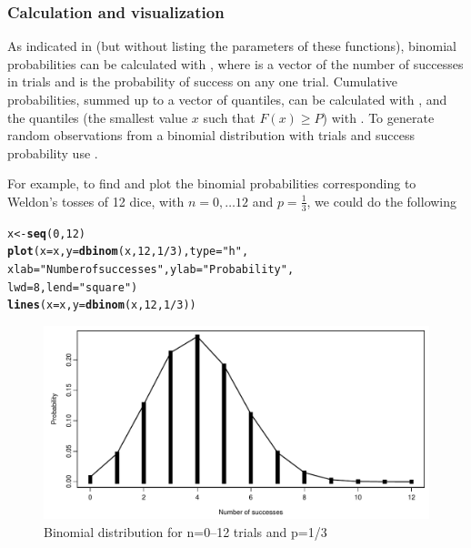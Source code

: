 \documentclass[11pt]{book}\usepackage[]{graphicx}\usepackage[]{color}
\makeatletter
\newcommand{\hlnum}[1]{\textcolor[rgb]{0.686,0.059,0.569}{#1}}%
\newcommand{\hlstr}[1]{\textcolor[rgb]{0.192,0.494,0.8}{#1}}%
\newcommand{\hlopt}[1]{\textcolor[rgb]{0,0,0}{#1}}%
\newcommand{\hlstd}[1]{\textcolor[rgb]{0.345,0.345,0.345}{#1}}%
\newcommand{\hlkwb}[1]{\textcolor[rgb]{0.69,0.353,0.396}{#1}}%
\newcommand{\hlkwc}[1]{\textcolor[rgb]{0.333,0.667,0.333}{#1}}%
\newcommand{\hlkwd}[1]{\textcolor[rgb]{0.737,0.353,0.396}{\textbf{#1}}}%
\newenvironment{kframe}{%
 \def\at@end@of@kframe{}%
 \ifinner\ifhmode%
  \def\at@end@of@kframe{\end{minipage}}%
  \begin{minipage}{\columnwidth}%
 \fi\fi%
 \def\FrameCommand##1{\hskip\@totalleftmargin \hskip-\fboxsep
 \colorbox{shadecolor}{##1}\hskip-\fboxsep
     \hskip-\linewidth \hskip-\@totalleftmargin \hskip\columnwidth}%
 \MakeFramed {\advance\hsize-\width
   \@totalleftmargin\z@ \linewidth\hsize
   \@setminipage}}%
 {\par\unskip\endMakeFramed%
 \at@end@of@kframe}
\newenvironment{knitrout}{}{} %
\renewenvironment{knitrout}{\small\renewcommand{\baselinestretch}{.85}}{} %
\makeatother
\begin{document}
\subsubsection{Calculation and visualization}
As indicated in  (but without listing the
parameters of these functions), 
binomial probabilities
can be calculated with , 
where  is a vector of the number of successes in 
trials and  is the probability of success on any one trial.
Cumulative probabilities, summed up to a vector of quantiles, 
can be calculated with ,
and the quantiles (the smallest value $x$ such that $F(x) \ge P$)
with .
To generate  random observations from a binomial distribution
with  trials and success probability 
use .


For example, to find and plot the binomial probabilities corresponding
to Weldon's tosses of 12 dice, with $n=0, \dots 12$ and $p=\frac13$,
we could do the following
\begin{knitrout}
\color{fgcolor}\begin{kframe}
\begin{alltt}
\hlstd{x} \hlkwb{<-} \hlkwd{seq}\hlstd{(}\hlnum{0}\hlstd{,} \hlnum{12}\hlstd{)}
\hlkwd{plot}\hlstd{(}\hlkwc{x}\hlstd{=x,} \hlkwc{y}\hlstd{=}\hlkwd{dbinom}\hlstd{(x,}\hlnum{12}\hlstd{,}\hlnum{1}\hlopt{/}\hlnum{3}\hlstd{),} \hlkwc{type}\hlstd{=}\hlstr{"h"}\hlstd{,}
  \hlkwc{xlab}\hlstd{=}\hlstr{"Number of successes"}\hlstd{,} \hlkwc{ylab}\hlstd{=}\hlstr{"Probability"}\hlstd{,}
        \hlkwc{lwd}\hlstd{=}\hlnum{8}\hlstd{,} \hlkwc{lend}\hlstd{=}\hlstr{"square"}\hlstd{)}
\hlkwd{lines}\hlstd{(}\hlkwc{x}\hlstd{=x,} \hlkwc{y}\hlstd{=}\hlkwd{dbinom}\hlstd{(x,}\hlnum{12}\hlstd{,}\hlnum{1}\hlopt{/}\hlnum{3}\hlstd{))}
\end{alltt}
\end{kframe}\begin{figure}[htbp]


\centerline{\includegraphics[width=.75\textwidth]{ch03/fig/dbinom1} }

\caption[Binomial distribution for n=0--12 trials and p=1/3]{Binomial distribution for n=0--12 trials and p=1/3\label{fig:dbinom1}}
\end{figure}


\end{knitrout}
\end{document}
